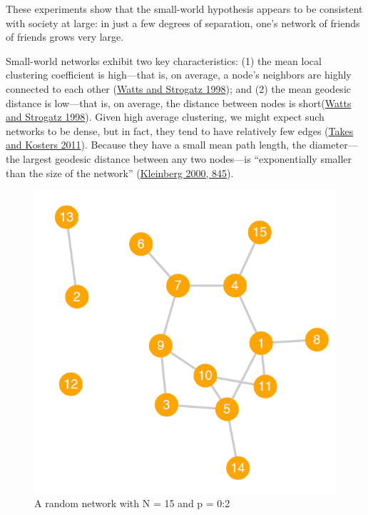 \documentclass{book}
\begin{document}
These experiments show that the small-world hypothesis appears to be
consistent with society at large: in just a few degrees of separation, one's
network of friends of friends grows very large.

Small-world networks exhibit two key characteristics: (1) the mean local
clustering coefficient is high---that is, on average, a node's neighbors are
highly connected to each other
(\protect\hyperlink{ref-WattsStrogatz1998}{Watts and Strogatz 1998}); and (2)
the mean geodesic distance is low---that is, on average, the distance between
nodes is short(\protect\hyperlink{ref-WattsStrogatz1998}{Watts and Strogatz
1998}). Given high average clustering, we might expect such networks to be
dense, but in fact, they tend to have relatively few edges
(\protect\hyperlink{ref-TakesKosters2011}{Takes and Kosters 2011}). Because
they have a small mean path length, the diameter---the largest geodesic
distance between any two nodes---is ``exponentially smaller than the size of
the network'' (\protect\hyperlink{ref-Kleinberg2000}{Kleinberg 2000, 845}).

\begin{figure}
\centering
\includegraphics{images/social-networks/11-12.png}
\caption{A random network with N = 15 and p = 0:2}
\end{figure}
\end{document}
